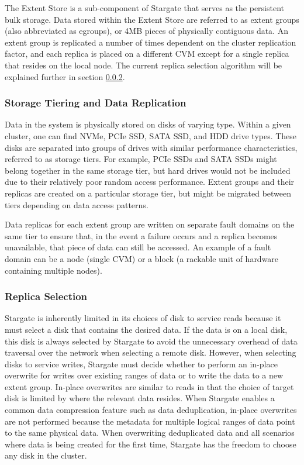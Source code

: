 \documentclass[12pt]{article}
\begin{document}
    The Extent Store is a sub-component of Stargate that serves as the
    persistent bulk storage. Data stored within the Extent Store are referred
    to as extent groups (also abbreviated as egroups), or 4MB pieces of
    physically contiguous data. An extent group is replicated a number of
    times dependent on the cluster replication factor, and each replica is
    placed on a different CVM except for a single replica that resides on the
    local node. The current replica selection algorithm will be explained
    further in section \ref{sec:replica-selection}.

    \subsubsection{Storage Tiering and Data Replication}

    Data in the system is physically stored on disks of varying type. Within a
    given cluster, one can find NVMe, PCIe SSD, SATA SSD, and HDD drive types.
    These disks are separated into groups of drives with similar performance
    characteristics, referred to as storage tiers. For example, PCIe SSDs and
    SATA SSDs might belong together in the same storage tier, but hard drives
    would not be included due to their relatively poor random access
    performance. Extent groups and their replicas are created on a particular
    storage tier, but might be migrated between tiers depending on data access
    patterns.

    Data replicas for each extent group are written on separate fault domains
    on the same tier to ensure that, in the event a failure occurs and a
    replica becomes unavailable, that piece of data can still be accessed. An
    example of a fault domain can be a node (single CVM) or a block (a rackable
    unit of hardware containing multiple nodes). 

    \subsubsection{Replica Selection} \label{sec:replica-selection}

    Stargate is inherently limited in its choices of disk to service reads
    because it must select a disk that contains the desired data. If the data is
    on a local disk, this disk is always selected by Stargate to avoid the
    unnecessary overhead of data traversal over the network when selecting a
    remote disk.  However, when selecting disks to service writes, Stargate
    must decide whether to perform an in-place overwrite for writes over
    existing ranges of data or to write the data to a new extent group.
    In-place overwrites are similar to reads in that the choice of target disk
    is limited by where the relevant data resides. When Stargate enables a
    common data compression feature such as data deduplication, in-place
    overwrites are not performed because the metadata for multiple logical ranges
    of data point to the same physical data. When overwriting deduplicated data
    and all scenarios where data is being created for the first time, Stargate
    has the freedom to choose any disk in the cluster.
\end{document}
